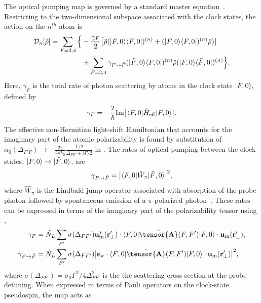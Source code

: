 \documentclass[preprint, aps,pra,onecolumn]{revtex4-1} %
\newcommand{\inp}{{\rm in}}
\newcommand{\charpol}{\alpha_0(\Delta_{F'F})}
\begin{document}
The optical pumping map is governed by a standard master equation~\cite{deutsch_quantum_2010}.  
Restricting to the two-dimensional subspace associated with the clock states, the action on the $n^{th}$ atom is
	\begin{align}
		\mathcal{D}_n[\hat{\rho}] =  \sum_{F=3,4} \Big\{& -\frac{\gamma_{F}}{2} \big[ \hat{\rho} (\lvert{F,0}\rangle\langle{F,0}\rvert)^{(n)} + (\lvert{F,0}\rangle\langle{F,0}\rvert)^{(n)}\hat{\rho} \big)]\\
		&+  \sum_{\tilde{F} =3,4}  \gamma_{F \rightarrow \tilde{F}}(\lvert{\tilde{F},0}\rangle\langle{F,0}\rvert)^{(n)} \hat{\rho}(\lvert{F,0}\rangle\langle{\tilde{F},0}\rvert)^{(n)} \Big\}.\nonumber
	\end{align}
Here, $\gamma_{F}$ is the total rate of photon scattering by atoms in the clock state $\lvert{F,0}\rangle$, defined by
	\begin{equation}
		\gamma_{F}=- \frac{2}{\hbar} {\rm Im} \big[ \langle{F,0}\rvert \hat{H}_{\rm eff}\lvert{F,0}\rangle \big] .
	\end{equation}
The effective non-Hermitian light-shift Hamiltonian that accounts for the imaginary part of the atomic polarizability is found by substitution of $\charpol \rightarrow -\frac{\sigma_0}{4\pi k_0}\frac{\Gamma/2}{\Delta_{FF'}+i\Gamma/2}$ in .  The rates of optical pumping between the clock states, $\lvert{F,0}\rangle \rightarrow \lvert{\tilde{F},0}\rangle$, are
	\begin{equation}
		\gamma_{F \rightarrow \tilde{F} } =\big| \langle{F,0}\rvert \hat{W}_\pi \lvert{\tilde{F},0}\rangle \big|^2,
	\end{equation}
where $\hat{W}_\pi$ is the Lindbald jump-operator associated with absorption of the probe photon followed by spontaneous emission of a $\pi$-polarized photon~\cite{deutsch_quantum_2010}.  These rates can be expressed in terms of the imaginary part of the polarizability tensor using ,
	\begin{align}
		\gamma_F &=\dot{N}_L  \sum_{F'} \sigma (\Delta_{FF'} ) \mathbf{u}^*_\inp(\br'_\perp)\cdot \bra{F,0} \hat{\tensor{\mbf{A}}}(F,F') \ket{F,0}  \cdot \mathbf{u}_\inp(\br'_\perp), \\
		\gamma_{F \rightarrow \tilde{F}}&=  \dot{N}_L  \sum_{F'} \sigma (\Delta_{FF'}) \big| \mathbf{e}_\pi\cdot \bra{\tilde{F},0} \hat{\tensor{\mbf{A}}}(F,F') \ket{F,0}  \cdot \mathbf{u}_\inp(\br'_\perp) \big|^2 ,
	\end{align}
where $ \sigma (\Delta_{FF'} )  = \sigma_0 \Gamma^2/4\Delta^2_{FF'}$ is the the scattering cross section at the probe detuning. When expressed in terms of Pauli operators on the clock-state pseudospin, the map acts as
\end{document}
